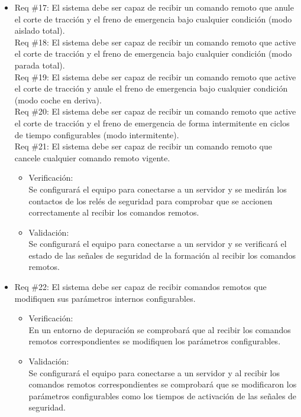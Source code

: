 \documentclass[11pt]{charter}
\begin{document}
\begin{itemize}
\item Req \#17: El sistema debe ser capaz de recibir un comando remoto que anule el corte de tracción y el freno de emergencia bajo cualquier condición (modo aislado total). \\
Req \#18: El sistema debe ser capaz de recibir un comando remoto que active el corte de tracción y el freno de emergencia bajo cualquier condición (modo parada total). \\
Req \#19: El sistema debe ser capaz de recibir un comando remoto que active el corte de tracción y anule el freno de emergencia bajo cualquier condición (modo coche en deriva). \\
Req \#20: El sistema debe ser capaz de recibir un comando remoto que active el corte de tracción y el freno de emergencia de forma intermitente en ciclos de tiempo configurables (modo intermitente). \\
Req \#21: El sistema debe ser capaz de recibir un comando remoto que cancele cualquier comando remoto vigente.
\begin{itemize}
  \item Verificación:\\
  Se configurará el equipo para conectarse a un servidor y se medirán los contactos de los relés de seguridad para comprobar que se accionen correctamente al recibir los comandos remotos.
  \item Validación:\\
  Se configurará el equipo para conectarse a un servidor y se verificará el estado de las señales de seguridad de la formación al recibir los comandos remotos.
\end{itemize}

\item Req \#22: El sistema debe ser capaz de recibir comandos remotos que modifiquen sus parámetros internos configurables.
\begin{itemize}
  \item Verificación:\\
  En un entorno de depuración se comprobará que al recibir los comandos remotos correspondientes se modifiquen los parámetros configurables.
  \item Validación:\\
  Se configurará el equipo para conectarse a un servidor y al recibir los comandos remotos correspondientes se comprobará que se modificaron los parámetros configurables como los tiempos de activación de las señales de seguridad.
\end{itemize}


\end{itemize}
\end{document}
